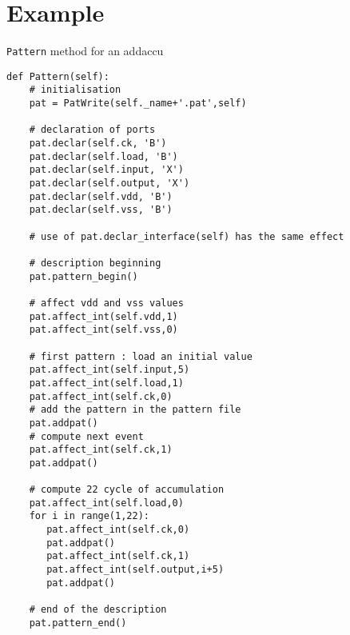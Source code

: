 \documentclass[12pt]{article}
\begin{document}
\section{Example}
\verb-Pattern- method for an addaccu
\begin{verbatim}
def Pattern(self):
    # initialisation
    pat = PatWrite(self._name+'.pat',self)

    # declaration of ports
    pat.declar(self.ck, 'B')
    pat.declar(self.load, 'B')
    pat.declar(self.input, 'X')
    pat.declar(self.output, 'X')
    pat.declar(self.vdd, 'B')
    pat.declar(self.vss, 'B')
    
    # use of pat.declar_interface(self) has the same effect

    # description beginning
    pat.pattern_begin()

    # affect vdd and vss values
    pat.affect_int(self.vdd,1)
    pat.affect_int(self.vss,0)

    # first pattern : load an initial value
    pat.affect_int(self.input,5)
    pat.affect_int(self.load,1)
    pat.affect_int(self.ck,0)
    # add the pattern in the pattern file
    pat.addpat()
    # compute next event
    pat.affect_int(self.ck,1)
    pat.addpat()

    # compute 22 cycle of accumulation
    pat.affect_int(self.load,0)
    for i in range(1,22):
       pat.affect_int(self.ck,0)
       pat.addpat()
       pat.affect_int(self.ck,1)
       pat.affect_int(self.output,i+5)
       pat.addpat()

    # end of the description
    pat.pattern_end()
\end{verbatim}
\end{document}
